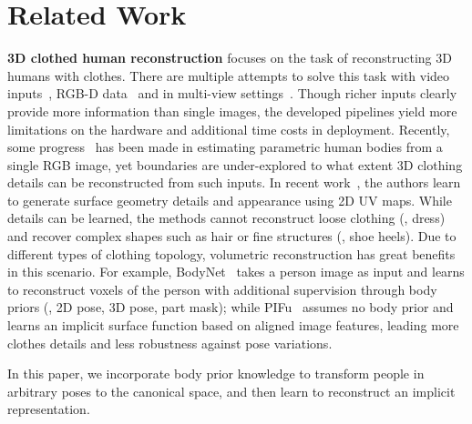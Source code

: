 \documentclass[10pt,twocolumn,letterpaper]{article}
\newcommand{\beforesection}{\vspace{-1mm}}
\newcommand{\aftersection}{\vspace{-1mm}}
\begin{document}
\beforesection
\section{Related Work} \label{sec:related}
\aftersection
\textbf{3D clothed human reconstruction} focuses on the task of reconstructing 3D humans with clothes. There are multiple attempts to solve this task with video inputs~\cite{Video3DAvatar3DV18,Video3DPeopleCVPR18,ClothCapTOG17,Video3DClothPeopleCVPR19,yangClothMocapECCV16}, RGB-D data~\cite{DoubleFusionCVPR18,HybridFusionECCV18} and in multi-view settings~\cite{MVDetailPoseShapeCVPR07,MVStereopsisTOG10,MVSkelSurfMocapCVPR09,MVArticulatedMeshAnimeTOG08,MVPhotoStereoTOG09,MVVisualHullTOG00,MVShadeMocapECCV12,bhatnagar2019mgn}. Though richer inputs clearly provide more information than single images, the developed pipelines yield more limitations on the hardware and additional time costs in deployment. Recently, some progress~\cite{bogo2016keep,HoloPoseCVPR19,kanazawa2018hmr,SPINICCV19,CMRCVPR19,lassner2017unite,tung2017self,DenseRaCICCV19,DeepHumanICCV19} has been made in estimating parametric human bodies from a single RGB image, yet boundaries are under-explored to what extent 3D clothing details can be reconstructed from such inputs.
In recent work~\cite{laehnerECCV18,lazova3dv2019,Tex2ShapeICCV19}, the authors learn to generate surface geometry details and appearance using 2D UV maps. While details can be learned, the methods cannot reconstruct loose clothing (\eg, dress) and recover complex shapes such as hair or fine structures (\eg, shoe heels).
Due to different types of clothing topology, volumetric reconstruction has great benefits in this scenario. For example, BodyNet~\cite{varol18_bodynet} takes a person image as input and learns to reconstruct voxels of the person with additional supervision through body priors (\eg, 2D pose, 3D pose, part mask); while PIFu~\cite{PIFuICCV19} assumes no body prior and learns an implicit surface function based on aligned image features, leading more clothes details and less robustness against pose variations.

In this paper, we incorporate body prior knowledge to transform people in arbitrary poses to the canonical space, and then learn to reconstruct an implicit representation.
\end{document}
